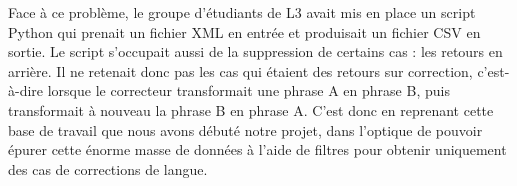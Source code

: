 \documentclass[11pt]{article}
\begin{document}
\newline
\newline
Face \`{a} ce probl\`{e}me, le groupe d'\'{e}tudiants de L3 avait mis en place un script Python qui prenait un fichier XML en entr\'{e}e et produisait un fichier CSV en sortie. Le script s'occupait aussi de la suppression de certains cas : les retours en arri\`{e}re. Il ne retenait donc pas les cas qui \'{e}taient des retours sur correction, c'est-\`{a}-dire lorsque le correcteur transformait une phrase A en phrase B, puis transformait \`{a} nouveau la phrase B en phrase A.
\newline
\newline
C'est donc en reprenant cette base de travail que nous avons d\'{e}but\'{e} notre projet, dans l'optique de pouvoir \'{e}purer cette \'{e}norme masse de donn\'{e}es \`{a} l'aide de filtres pour obtenir uniquement des cas de corrections de langue.




\end{document}
